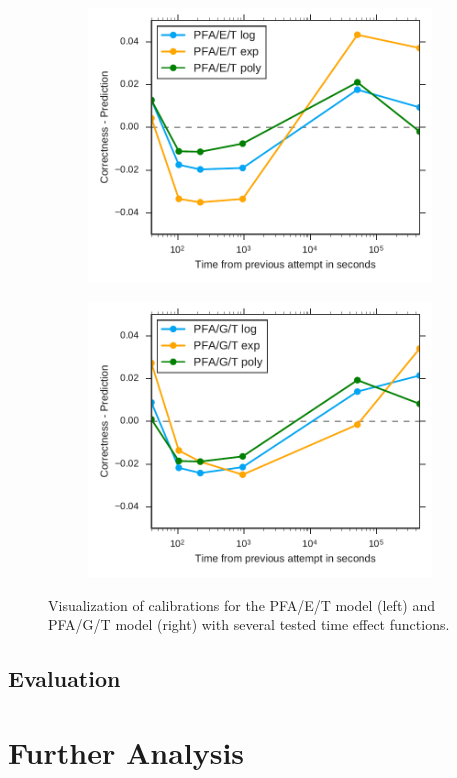 \begin{figure}[htbp]
  \centering
  \begin{subfigure}{.49\textwidth}
    \centering
    \includegraphics[width=\textwidth]{img/calibration-pfaet}
    \caption{}
    \label{fig:calibration-pfaet}
  \end{subfigure}
  \begin{subfigure}{.49\textwidth}
    \centering
    \includegraphics[width=\textwidth]{img/calibration-pfagt}
    \caption{}
    \label{fig:calibration-pfagt}
  \end{subfigure}
  \caption{Visualization of calibrations for the PFA/E/T model (left) and PFA/G/T model (right) with several tested time effect functions.}
  \label{fig:calibration2}
\end{figure}

\subsection{Evaluation}
\label{evaluation}

\section{Further Analysis}
\label{further-analysis}
